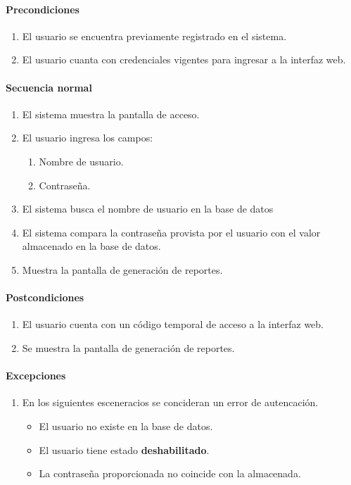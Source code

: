 \paragraph{Precondiciones}
\begin{enumerate}
  \item El usuario se encuentra previamente registrado en el sistema.
  \item El usuario cuanta con credenciales vigentes para ingresar a la interfaz web.
\end{enumerate}
\paragraph{Secuencia normal}
\begin{enumerate}
  \item El sistema muestra la pantalla de acceso.
  \item El usuario ingresa los campos:
  \begin{enumerate}
    \item Nombre de usuario.
    \item Contraseña.
  \end{enumerate}
  \item El sistema busca el nombre de usuario en la base de datos
  \item El sistema compara la contraseña provista por el usuario con el valor almacenado en la base de datos.
  \item Muestra la pantalla de generación de reportes.
\end{enumerate}
\paragraph{Postcondiciones}
\begin{enumerate}
  \item El usuario cuenta con un código temporal de acceso a la interfaz web.
  \item Se muestra la pantalla de generación de reportes.
\end{enumerate}
\paragraph{Excepciones}
\begin{enumerate}
  \item En los siguientes esceneracios se concideran un error de autencación.
  \begin{itemize}
    \item El usuario no existe en la base de datos.
    \item El usuario tiene estado \textbf{deshabilitado}.
    \item La contraseña proporcionada no coincide con la almacenada. 
  \end{itemize}
\end{enumerate}

